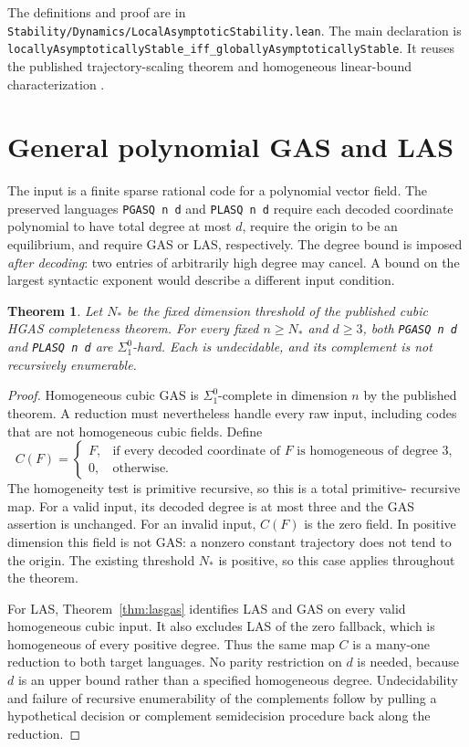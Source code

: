 \documentclass[11pt]{article}
\newtheorem{theorem}{Theorem}[section]
\newcommand{\code}[1]{{\small\nolinkurl{#1}}}
\begin{document}
The definitions and proof are in
\code{Stability/Dynamics/LocalAsymptoticStability.lean}. The main
declaration is
\code{locallyAsymptoticallyStable_iff_globallyAsymptoticallyStable}.
It reuses the published trajectory-scaling theorem and homogeneous
linear-bound characterization \cite[Lemma 1.5]{korda}.

\section{General polynomial GAS and LAS}

The input is a finite sparse rational code for a polynomial vector field.
The preserved languages \code{PGASQ n d} and \code{PLASQ n d} require each decoded
coordinate polynomial to have total degree at most $d$, require the origin
to be an equilibrium, and require GAS or LAS, respectively. The degree
bound is imposed \emph{after decoding}: two entries of arbitrarily high
degree may cancel. A bound on the largest syntactic exponent would describe
a different input condition.

\begin{theorem}
Let $N_*$ be the fixed dimension threshold of the published cubic HGAS
completeness theorem. For every fixed $n\ge N_*$ and $d\ge3$, both
\code{PGASQ n d} and \code{PLASQ n d} are $\Sigma^0_1$-hard. Each is
undecidable, and its complement is not recursively enumerable.
\end{theorem}

\begin{proof}
Homogeneous cubic GAS is $\Sigma^0_1$-complete in dimension $n$ by the
published theorem. A reduction must nevertheless handle every raw input,
including codes that are not homogeneous cubic fields. Define
\[
 C(F)=\begin{cases}
 F,&\text{if every decoded coordinate of $F$ is homogeneous of degree 3},\\
 0,&\text{otherwise}.
 \end{cases}
\]
The homogeneity test is primitive recursive, so this is a total primitive-
recursive map. For a valid input, its decoded degree is at most three and
the GAS assertion is unchanged. For an invalid input, $C(F)$ is the zero
field. In positive dimension this field is not GAS: a nonzero constant
trajectory does not tend to the origin. The existing threshold $N_*$ is
positive, so this case applies throughout the theorem.

For LAS, Theorem~\ref{thm:lasgas} identifies LAS and GAS on every valid
homogeneous cubic input. It also excludes LAS of the zero fallback, which
is homogeneous of every positive degree. Thus the same map $C$ is a
many-one reduction to both target languages. No parity restriction on $d$
is needed, because $d$ is an upper bound rather than a specified homogeneous
degree. Undecidability and failure of recursive enumerability of the
complements follow by pulling a hypothetical decision or complement
semidecision procedure back along the reduction.
\end{proof}
\end{document}
